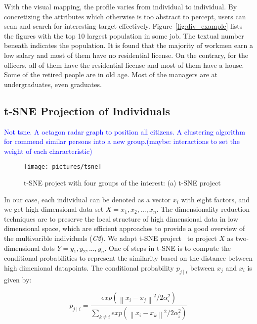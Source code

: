 With the visual mapping, the profile varies from individual to individual. By concretizing the attributes which otherwise is too abstract to percept, users can scan and search for interesting target effectively. Figure~\ref{fig:div_example} lists the figures with the top 10 largest population in some job. The textual number beneath indicates the population. It is found that the majority of workmen earn a low salary and most of them have no residential license. On the contrary, for the officers, all of them have the residential license and most of them have a house. Some of the retired people are in old age. Most of the managers are at undergraduates, even graduates.

\subsection{t-SNE Projection of Individuals}
\textcolor{blue}{Not tsne. A octagon radar graph to position all citizens. A clustering algorithm for commend similar persons into a new group.(maybe: interactions to set the weight of each characteristic)}

\begin{figure}[htb!]
 \centering %
 \texttt{[image: pictures/tsne]}
 \caption{t-SNE project with four groups of the interest: (a) t-SNE project }
 \label{fig:tsne}
\end{figure}

In our case, each individual can be denoted as a vector $x_i$ with eight factors, and we get high dimensional data set $X={x_1, x_2, ..., x_n}$. The dimensionality reduction techniques are to preserve the local structure of high dimensional data in low dimensional space, which are efficient approaches to provide a good overview of the multivarible individuals (\textit{C2}). We adapt t-SNE project~\citep{maaten2008visualizing} to project $X$ as two-dimensional dots $Y={y_1, y_2, ..., y_n}$. One of steps in t-SNE is to compute the conditional probabilities to represent the similarity based on the distance between high dimenional datapoints. The conditional probability $p_{j\mid i}$ between $x_j$ and $x_i$ is given by:

\begin{equation}
p_{j\mid i} = \frac{exp({\left \| x_i - x_j \right \|}^2/2\alpha_i ^{2})}{\sum _{k\neq i}exp({\left \| x_i - x_k \right \|}^2/2\alpha_i ^{2})}
\end{equation}

